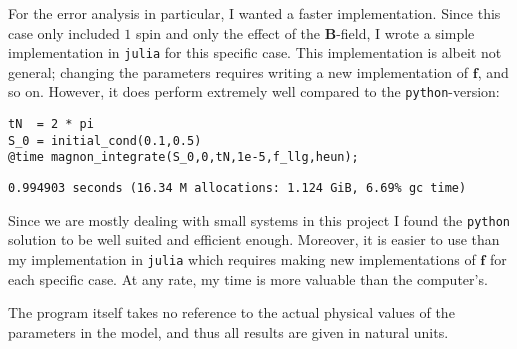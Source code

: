 For the error analysis in particular, I wanted a faster implementation. Since this case only included $1$ spin and only the effect of the $\mathbf{B}$-field, I wrote a simple implementation in \texttt{julia} for this specific case. This implementation is albeit not general; changing the parameters requires writing a new implementation of $\mathbf{f}$, and so on. However, it does perform extremely well compared to the \texttt{python}-version:

\begin{lstlisting}
tN  = 2 * pi
S_0 = initial_cond(0.1,0.5)
@time magnon_integrate(S_0,0,tN,1e-5,f_llg,heun);
\end{lstlisting}
\texttt{\small 0.994903 seconds (16.34 M allocations: 1.124 GiB, 6.69\% gc time)}

Since we are mostly dealing with small systems in this project I found the \texttt{python} solution to be well suited and efficient enough. Moreover, it is easier to use than my implementation in \texttt{julia} which requires making new implementations of $\mathbf{f}$ for each specific case. At any rate, my time is more valuable than the computer's. 

The program itself takes no reference to the actual physical values of the parameters in the model, and thus all results are given in natural units.